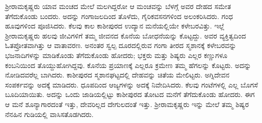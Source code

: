 ಶ‍್ರೀರಾಮಕೃಷ್ಣರು ಯಾವ ಮಂಚದ ಮೇಲೆ ಮಲಗಿದ್ದರೋ ಆ ಮಂಚವನ್ನು ಬೆಳಗ್ಗೆ ಅವರ ದೇಹದ ಸಮೇತ ತೆಗೆದುಕೊಂಡು ಬಂದರು. ಅದನ್ನು ಗಂಗಾಜಲದಿಂದ ತೊಳೆದು, ಗೈರಿಕವಸನಗಳಿಂದ ಅಲಂಕರಿಸಿದರು. ಗಂಧ ಹೂವುಗಳಿಂದ ಪೂಜಿಸಿದರು. ಕೆಲವು ಕಾಲ ಕಾಶೀಪುರದ ಉದ್ಯಾನ ಮನೆಯಲ್ಲಿಯೇ ಕಳೇಬರವಿತ್ತು. ಇಲ್ಲೆ ಶ‍್ರೀರಾಮಕೃಷ್ಣರು ಹಲವು ಜೀವಿಗಳಿಗೆ ತಮ್ಮ ಜೀವನದ ಕೊನೆಯ ಬೋಧನೆಯನ್ನು ಕೊಟ್ಟದ್ದು. ಅವರ ವ್ಯಕ್ತಿತ್ವದಿಂದ ಓತಪ್ರೋತವಾಗಿತ್ತು ಆ ವಾತಾವರಣ. ಅನಂತರ ಸ್ವಲ್ಪ ದೂರದಲ್ಲಿರುವ ಗಂಗಾ ತೀರದ ಸ್ಮಶಾನಕ್ಕೆ ಕಳೇಬರವನ್ನು ಭಜನಾದಿಗಳನ್ನು ಮಾಡಿಕೊಂಡು ತೆಗೆದುಕೊಂಡು ಹೋದರು; ಭಕ್ತರು ಮತ್ತು ಶಿಷ್ಯರು ಎಲ್ಲರ ಕಣ್ಣುಗಳೂ ಕಂಬನಿಯಿಂದ ತೊಯ್ದುಹೋಗಿದ್ದವು. ಕೊನೆಯ ಪ್ರಯಾಣಕ್ಕೆ ಎಲ್ಲರೂ ಕ್ರಮೇಣ ತಮ್ಮ ಹೆಗಲನ್ನು ಕೊಟ್ಟರು. ಅದನ್ನು ನೋಡಿದವರೆಲ್ಲ ಬಾಗಿದರು. ಕಾಶೀಪುರದ ಸ್ಮಶಾನಘಟ್ಟದಲ್ಲಿ ದೇಹವನ್ನು ಚಿತೆಯ ಮೇಲಿಟ್ಟರು. ಅಗ್ನಿದೇವನ ಸಂಪರ್ಕವನ್ನು ಅದಕ್ಕೆ ಮಾಡಿದರು. ಧೂಪದಿಂದ ಆಜ್ಯಗಳನ್ನು ಅದಕ್ಕೆ ನಿವೇದಿಸಿದರು. ಕೆಲವು ಗಂಟೆಗಳಲ್ಲಿ ಎಲ್ಲ ಬೊಗಸೆ ಬೂದಿಯಾಯಿತು. ಅದನ್ನು ಒಂದು ಜಾಡಿಯಲ್ಲಿಟ್ಟು ಕಾಶೀಪುರದ ತೋಟದ ಮನೆಗೆ ತೆಗೆದುಕೊಂಡು ಹೋದರು. ಈಗ ಆ ಮನೆ ಶೂನ್ಯಾಗಾರದಂತೆ ಇತ್ತು, ದೇವರಿಲ್ಲದ ದೇಗುಲದಂತೆ ಇತ್ತು. ಶ‍್ರೀರಾಮಕೃಷ್ಣರು ಇನ್ನು ಮೇಲೆ ತಮ್ಮ ಶಿಷ್ಯರ ನೆನಹಿನ ಗುಡಿಯಲ್ಲಿ ವಾಸಿಸತೊಡಗಿದರು.

